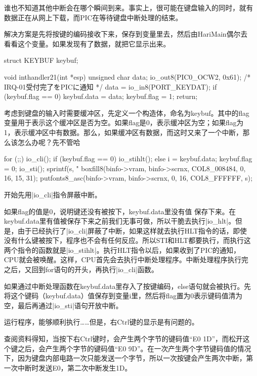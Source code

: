 谁也不知道其他中断会在哪个瞬间到来。事实上，很可能在键盘输入的同时，就有数据正在从网上下载，而PIC在等待键盘中断处理的结束。

\cs

解决方案是先将按键的编码接收下来，保存到变量里去，然后由HariMain偶尔去看看这个变量。如果发现有了数据，就把它显示出来。

\begin{code}
struct KEYBUF keybuf;

void inthandler21(int *esp)
{
	unsigned char data;
	io_out8(PIC0_OCW2, 0x61);	/* IRQ-01受付完了をPICに通知 */
	data = io_in8(PORT_KEYDAT);
	if (keybuf.flag == 0) {
		keybuf.data = data;
		keybuf.flag = 1;
	}
	return;
}
\end{code}

考虑到键盘的输入时需要缓冲区，先定义一个构造体，命名为keybuf。其中的flag变量用于表示这个缓冲区是否为空。如果flag是0，表示缓冲区为空；如果flag为1，表示缓冲区中有数据。那么，如果缓冲区有数据，而这时又来了一个中断，那么该怎么办呢？先不管哈~

\cs

\begin{code}[label=bootpack.c中HariMain函数节选]
for (;;) {
		io_cli();
		if (keybuf.flag == 0) {
			io_stihlt();
		} else {
			i = keybuf.data;
			keybuf.flag = 0;
			io_sti();
			sprintf(s, "%
			boxfill8(binfo->vram, binfo->scrnx, COL8_008484, 0, 16, 15, 31);
			putfonts8_asc(binfo->vram, binfo->scrnx, 0, 16, COL8_FFFFFF, s);
		}
	}
\end{code}

开始先用|io_cli|指令屏蔽中断。

如果flag的值是0，说明键还没有被按下，keybuf.data里没有值 保存下来。在keybuf.data里有值被保存下来之前我们无事可做，所以干脆去执行|io_hlt|。但是，由于已经执行了|io_cli|屏蔽了中断，如果这样就去执行HLT指令的话，即使没有什么键被按下，程序也不会有任何反应。所以STI和HLT都要执行，而执行这两个指令的函数就是|io_stihlt|。执行HLT指令以后，如果收到了PIC的通知，CPU就会被唤醒。这样，CPU首先会去执行中断处理程序。中断处理程序执行完之后，又回到for语句的开头，再执行|io_cli|函数。

如果通过中断处理函数在keybuf.data里存入了按键编码，else语句就会被执行。先将这个键码（keybuf.data）值保存到变量i里，然后将flag置为0表示键码值清为空，最后再通过|io_sti|语句开放中断。

\cs

运行程序，能够顺利执行……但是，右Ctrl键的显示是有问题的。

查阅资料得知，当按下右Ctrl键时，会产生两个字节的键码值“E0 1D”，而松开这个键之后，会产生两个字节的键码值“E0 9D”。在一次产生两个字节键码值的情况下，因为键盘内部电路一次只能发送一个字节，所以一次按键会产生两次中断，第一次中断时发送E0，第二次中断发生1D。

